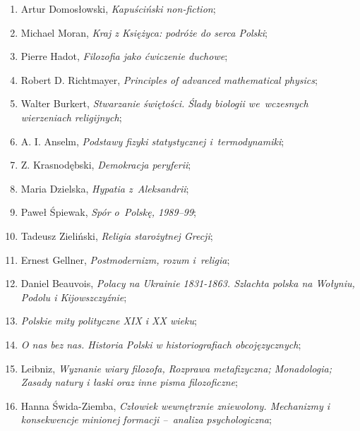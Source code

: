 \documentclass[a4paper,11pt]{article}
\begin{document}
\begin{enumerate}
\item Artur Domosłowski, \textit{Kapuściński non-fiction};

\item Michael Moran, \textit{Kraj z Księżyca: podróże do serca Polski};

\item Pierre Hadot, \textit{Filozofia jako ćwiczenie duchowe};

\item Robert D. Richtmayer, \textit{Principles of advanced mathematical
    physics};

\item Walter Burkert, \textit{Stwarzanie świętości. Ślady biologii
    we~wczesnych wierzeniach religijnych};

\item A. I. Anselm, \textit{Podstawy fizyki statystycznej
    i~termodynamiki};

\item Z. Krasnodębski, \textit{Demokracja peryferii};

\item Maria Dzielska, \textit{Hypatia z~Aleksandrii};

\item Paweł Śpiewak, \textit{Spór o~Polskę, 1989--99};

\item Tadeusz Zieliński, \textit{Religia starożytnej Grecji};

\item Ernest Gellner, \textit{Postmodernizm, rozum i~religia};

\item Daniel Beauvois, \textit{Polacy na Ukrainie 1831-1863. Szlachta
    polska na Wołyniu, Podolu i Kijowszczyźnie};

\item \textit{Polskie mity polityczne XIX i XX wieku};

\item \textit{O nas bez nas. Historia Polski w historiografiach
    obcojęzycznych};

\item Leibniz, \textit{Wyznanie wiary filozofa, Rozprawa metafizyczna;
    Monadologia; Zasady natury i łaski oraz inne pisma filozoficzne};

\item Hanna Świda-Ziemba, \textit{Człowiek wewnętrznie zniewolony.
    Mechanizmy i konsekwencje minionej formacji --~analiza
    psychologiczna};


\end{enumerate}
\end{document}
